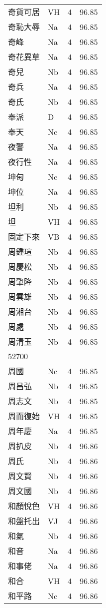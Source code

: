 \documentclass[twocolumn]{book}
\begin{document}
\begin{supertabular}{llrr}
奇貨可居 & VH & 4 &  96.85\\
奇恥大辱 & Na & 4 &  96.85\\
奇峰 & Na & 4 &  96.85\\
奇花異草 & Na & 4 &  96.85\\
奇兒 & Nb & 4 &  96.85\\
奇兵 & Na & 4 &  96.85\\
奇氏 & Nb & 4 &  96.85\\
奉派 & D & 4 &  96.85\\
奉天 & Nc & 4 &  96.85\\
夜警 & Na & 4 &  96.85\\
夜行性 & Na & 4 &  96.85\\
坤甸 & Nc & 4 &  96.85\\
坤位 & Na & 4 &  96.85\\
坦利 & Nb & 4 &  96.85\\
坦 & VH & 4 &  96.85\\
固定下來 & VB & 4 &  96.85\\
周鍾瑄 & Nb & 4 &  96.85\\
周慶松 & Nb & 4 &  96.85\\
周肇隆 & Nb & 4 &  96.85\\
周雲雄 & Nb & 4 &  96.85\\
周湘台 & Nb & 4 &  96.85\\
周處 & Nb & 4 &  96.85\\
周清玉 & Nb & 4 &  96.85\\
52700\\
周國 & Nc & 4 &  96.85\\
周昌弘 & Nb & 4 &  96.85\\
周志文 & Nb & 4 &  96.85\\
周而復始 & VH & 4 &  96.85\\
周年慶 & Na & 4 &  96.85\\
周扒皮 & Nb & 4 &  96.86\\
周氏 & Nb & 4 &  96.86\\
周文賢 & Nb & 4 &  96.86\\
周文國 & Nb & 4 &  96.86\\
和顏悅色 & VH & 4 &  96.86\\
和盤托出 & VJ & 4 &  96.86\\
和氣 & Nb & 4 &  96.86\\
和音 & Na & 4 &  96.86\\
和事佬 & Na & 4 &  96.86\\
和合 & VH & 4 &  96.86\\
和平路 & Nc & 4 &  96.86\\

\end{supertabular}
\end{document}
